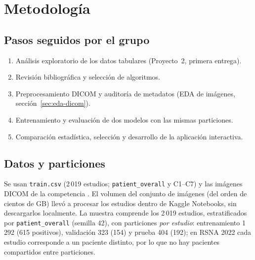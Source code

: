 \section{Metodolog\'ia}
\subsection{Pasos seguidos por el grupo}
\begin{enumerate}[nosep]
\item An\'alisis exploratorio de los datos tabulares (Proyecto~2, primera entrega).
\item Revisi\'on bibliogr\'afica y selecci\'on de algoritmos.
\item Preprocesamiento DICOM y auditor\'ia de metadatos (EDA de im\'agenes, secci\'on~\ref{sec:eda-dicom}).
\item Entrenamiento y evaluaci\'on de dos modelos con las mismas particiones.
\item Comparaci\'on estad\'istica, selecci\'on y desarrollo de la aplicaci\'on interactiva.
\end{enumerate}

\subsection{Datos y particiones}
Se usan \texttt{train.csv} (2\,019 estudios; \texttt{patient\_overall} y C1--C7) y las im\'agenes DICOM de la competencia \citep{rsna2022kaggle}. El volumen del conjunto de im\'agenes (del orden de cientos de GB) llev\'o a procesar los estudios dentro de Kaggle Notebooks, sin descargarlos localmente.
La muestra comprende los 2\,019 estudios, estratificados por \texttt{patient\_overall} (semilla 42), con particiones \emph{por estudio}: entrenamiento 1\,292 (615 positivos), validaci\'on 323 (154) y prueba 404 (192); en RSNA 2022 cada estudio corresponde a un paciente distinto, por lo que no hay pacientes compartidos entre particiones.


